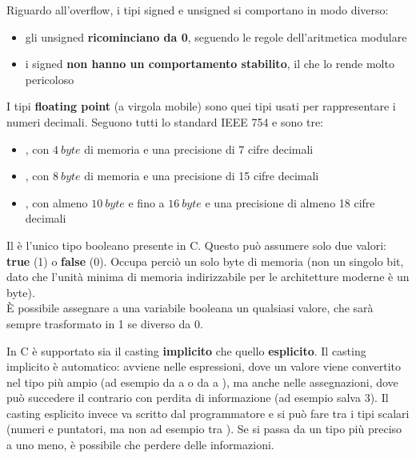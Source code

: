 \documentclass[11pt, a4paper, titlepage, oneside]{scrbook}
\begin{document}
Riguardo all'overflow, i tipi signed e unsigned si comportano in modo diverso:
\begin{itemize}
    \item gli unsigned \textbf{ricominciano da 0}, seguendo le regole dell'aritmetica modulare
    \item i signed \textbf{non hanno un comportamento stabilito}, il che lo rende molto pericoloso
\end{itemize}

\begin{Definizione}
\label{def-tipi-floating-point}
I tipi \textbf{floating point} (a virgola mobile) sono quei tipi usati per rappresentare i numeri decimali. Seguono tutti lo standard IEEE 754 e sono tre:
\begin{itemize}
    \item {}, con $\SI{4}{byte}$ di memoria e una precisione di 7 cifre decimali
    \item {}, con $\SI{8}{byte}$ di memoria e una precisione di 15 cifre decimali
    \item {}, con almeno $\SI{10}{byte}$ e fino a $\SI{16}{byte}$ e una precisione di almeno 18 cifre decimali
\end{itemize} 
\end{Definizione}

\begin{Definizione}
\label{def-bool}
Il  è l'unico tipo booleano presente in C. Questo può assumere solo due valori: \textbf{true} (1) o \textbf{false} (0). Occupa perciò un solo byte di memoria (non un singolo bit, dato che l'unità minima di memoria indirizzabile per le architetture moderne è un byte). \\
\NB È possibile assegnare a una variabile booleana un qualsiasi valore, che sarà sempre trasformato in 1 se diverso da 0.
\end{Definizione}

\begin{Proprieta}
\label{prop-type-casting}
In C è supportato sia il casting \textbf{implicito} che quello \textbf{esplicito}. Il casting implicito è automatico: avviene nelle espressioni, dove un valore viene convertito nel tipo più ampio (ad esempio da  a  o da  a ), ma anche nelle assegnazioni, dove può succedere il contrario con perdita di informazione (ad esempio  salva 3). Il casting esplicito invece va scritto dal programmatore e si può fare tra i tipi scalari (numeri e puntatori, ma non ad esempio tra ). Se si passa da un tipo più preciso a uno meno, è possibile che perdere delle informazioni.
\end{Proprieta}
\end{document}
